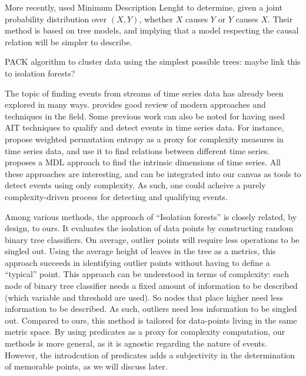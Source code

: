 \documentclass[conference]{IEEEtran}
\begin{document}
More recently, \cite{marx_causal_2018} used Minimum Description Lenght to determine, given a joint probability distribution over $(X,Y)$, whether $X$ causes $Y$ or $Y$ causes $X$. Their method is based on tree models, and implying that a model respecting the causal relation will be simpler to describe.

\cite{tatti_finding_2008} PACK algorithm to cluster data using the simplest possible trees: maybe link this to isolation forests?

The topic of finding events from streams of time series data has already been explored in many ways.
\cite{aggarwal_outlier_2017} provides good review of modern approaches and techniques
in the field. Some previous work can also be noted for having used AIT techniques to qualify and detect events in time series data. For instance, \cite{batista_complexity-invariant_2011,fadlallah_weighted-permutation_2013} propose weighted permutation entropy as a proxy for complexity measures in time series data, and use it to find relations between different time series. \cite{hu_discovering_2011} proposes a MDL approach to find the intrinsic dimensions of time series. All these approaches are interesting, and can be integrated into our canvas as tools to detect events using only complexity. As such, one could acheive a purely complexity-driven process for detecting and qualifying events.


Among various methods, the approach of ``Isolation forests''\cite{liu_isolation_2008,hariri_extended_2021} is closely related, by design, to ours. It evaluates the isolation of data points by constructing random binary tree classifiers. On average, outlier points will require less operations to be singled out. Using the average height of leaves in the tree as a metrics, this approach succeeds in identifying outlier points without having to define a ``typical'' point. This approach can be understood in terms of complexity: each node of binary tree classifier needs a fixed amount of information to be described (which variable and threshold are used). So nodes that place higher need less information to be described. As such, outliers need less information to be singled out. Compared to ours, this method is tailored for data-points living in the same metric space. By using predicates as a proxy for complexity computation, our methods is more general, as it is agnostic regarding the nature of events. However, the introdcution of predicates adds a subjectivity in the determination of memorable points, as we will discuss later.
\end{document}
